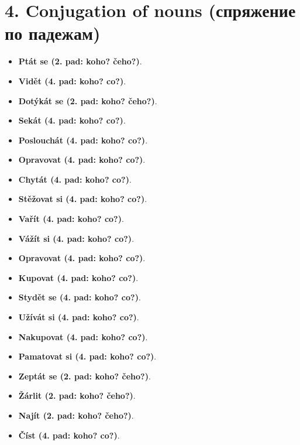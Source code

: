 \documentclass[12pt]{book}
\newcommand{\words}[2]{
    \renewcommand\chaptername{}
    \renewcommand\thechapter{}
    \chapter{#1. #2}
    \renewcommand\thechapter{#1}
}
\begin{document}
\words{4}{Conjugation of nouns (\textrussian{спряжение по падежам})}
\begin{itemize}
    \item \textbf{Ptát se (2. pad: koho? čeho?)}.
    \item \textbf{Vidět (4. pad: koho? co?)}.
    \item \textbf{Dotýkát se (2. pad: koho? čeho?)}.
    \item \textbf{Sekát (4. pad: koho? co?)}.
    \item \textbf{Poslouchát (4. pad: koho? co?)}.
    \item \textbf{Opravovat (4. pad: koho? co?)}.
    \item \textbf{Chytát (4. pad: koho? co?)}.
    \item \textbf{Stěžovat si (4. pad: koho? co?)}.
    \item \textbf{Vařít (4. pad: koho? co?)}.
    \item \textbf{Vážít si (4. pad: koho? co?)}.
    \item \textbf{Opravovat (4. pad: koho? co?)}.
    \item \textbf{Kupovat (4. pad: koho? co?)}.
    \item \textbf{Stydět se (4. pad: koho? co?)}.
    \item \textbf{Užívát si (4. pad: koho? co?)}.
    \item \textbf{Nakupovat (4. pad: koho? co?)}.
    \item \textbf{Pamatovat si (4. pad: koho? co?)}.
    \item \textbf{Zeptát se (2. pad: koho? čeho?)}.
    \item \textbf{Žárlit (2. pad: koho? čeho?)}.
    \item \textbf{Najít (2. pad: koho? čeho?)}.
    \item \textbf{Číst (4. pad: koho? co?)}.
\end{itemize}
\end{document}
